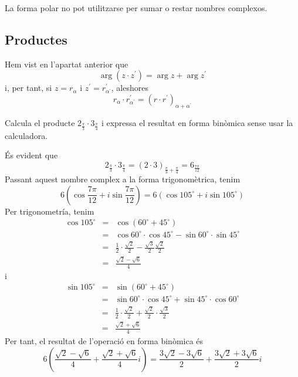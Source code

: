 La forma polar no pot utilitzarse per sumar o restar nombres complexos.

\subsection{Productes}

Hem vist en l’apartat anterior que
\begin{equation*}
\arg (z\cdot z^{\prime })=\arg z+\arg z^{\prime }
\end{equation*}
i, per tant, si $z=r_{\alpha }$ i $z^{\prime }=r_{\alpha ^{\prime
}}^{\prime }$, aleshores
\begin{equation*}
r_{\alpha }\cdot r_{\alpha ^{\prime }}^{\prime }=(r\cdot r^{\prime
})_{\alpha +\alpha ^{\prime }}
\end{equation*}

\begin{exemple}
Calcula el producte $2_{\frac{\pi }{3}}\cdot 3_{\frac{\pi }{4}}$ i expressa
el resultat en forma binòmica sense usar la calculadora.
\end{exemple}

\begin{solucio}
És evident que
\begin{equation*}
2_{\frac{\pi }{3}}\cdot 3_{\frac{\pi }{4}}=\left( 2\cdot 3\right) _{\frac{
\pi }{3}+\frac{\pi }{4}}=6_{\frac{7\pi }{12}}
\end{equation*}
Passant aquest nombre complex a la forma trigonomètrica, tenim
\begin{equation*}
6\left( \cos \frac{7\pi }{12}+i\sin \frac{7\pi }{12}\right) =6(\cos 105
^{\circ}
+i\sin 105
^{\circ}
)
\end{equation*}
Per trigonometría, tenim
\begin{eqnarray*}
\cos 105
^{\circ}
&=&\cos (60
^{\circ}
+45
^{\circ}
) \\
&=&\cos 60
^{\circ}
\cdot \cos 45
^{\circ}
-\sin 60
^{\circ}
\cdot \sin 45
^{\circ}
\\
&=&\frac{1}{2}\cdot \frac{\sqrt{2}}{2}-\frac{\sqrt{3}}{2}\frac{\sqrt{2}}{2}
\\
&=&\frac{\sqrt{2}-\sqrt{6}}{4}
\end{eqnarray*}
i
\begin{eqnarray*}
\sin 105
^{\circ}
&=&\sin (60
^{\circ}
+45
^{\circ}
) \\
&=&\sin 60
^{\circ}
\cdot \cos 45
^{\circ}
+\sin 45
^{\circ}
\cdot \cos 60
^{\circ}
\\
&=&\frac{1}{2}\cdot \frac{\sqrt{2}}{2}+\frac{\sqrt{2}}{2}\cdot \frac{\sqrt{3}
}{2} \\
&=&\frac{\sqrt{2}+\sqrt{6}}{4}
\end{eqnarray*}
Per tant, el resultat de l’operació en forma binòmica és
\begin{equation*}
6\left( \frac{\sqrt{2}-\sqrt{6}}{4}+\frac{\sqrt{2}+\sqrt{6}}{4}i\right) =
\frac{3\sqrt{2}-3\sqrt{6}}{2}+\frac{3\sqrt{2}+3\sqrt{6}}{2}i
\end{equation*}
\end{solucio}


